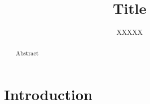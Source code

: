 \documentclass[
  a4paper, %
  11pt, %
  onecolumn, %
  openright, %
]{memoir}
\title{Title}
\author{XXXXX}
\begin{document}
\maketitle

\begin{abstract}
    Abstract
\end{abstract}

\section{Introduction}
\end{document}
